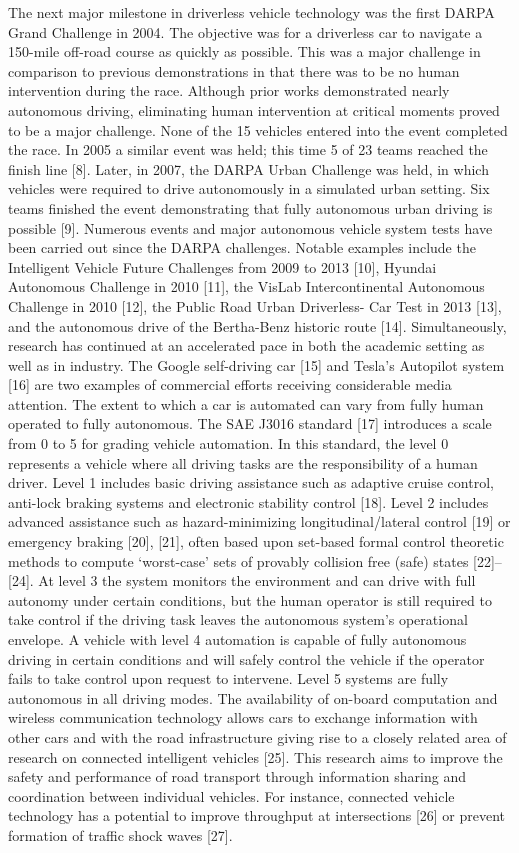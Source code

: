 The next major milestone in driverless vehicle technology was the first DARPA Grand Challenge in 2004. The objective was for a driverless car to navigate a 150-mile off-road course as quickly as possible. This was a major challenge in comparison to previous demonstrations in that there was to be no human intervention during the race. Although prior works demonstrated nearly autonomous driving, eliminating human intervention at critical moments proved to be a major challenge. None of the 15 vehicles entered into the event completed the race. In 2005 a similar event was held; this time 5 of 23 teams reached the finish line [8]. Later, in 2007, the DARPA Urban Challenge was held, in which vehicles were required to drive autonomously in a simulated urban setting. Six teams finished the event demonstrating that fully autonomous urban driving is possible [9]. Numerous events and major autonomous vehicle system tests have been carried out since the DARPA challenges. Notable examples include the Intelligent Vehicle Future Challenges from 2009 to 2013 [10], Hyundai Autonomous Challenge in 2010 [11], the VisLab Intercontinental Autonomous Challenge in 2010 [12], the Public Road Urban Driverless- Car Test in 2013 [13], and the autonomous drive of the Bertha-Benz historic route [14]. Simultaneously, research has continued at an accelerated pace in both the academic setting as well as in industry. The Google self-driving car [15] and Tesla’s Autopilot system [16] are two examples of commercial efforts receiving considerable media attention. The extent to which a car is automated can vary from fully human operated to fully autonomous. The SAE J3016 standard [17] introduces a scale from 0 to 5 for grading vehicle automation. In this standard, the level 0 represents a vehicle where all driving tasks are the responsibility of a human driver. Level 1 includes basic driving assistance such as adaptive cruise control, anti-lock braking systems and electronic stability control [18]. Level 2 includes advanced assistance such as hazard-minimizing longitudinal/lateral control [19] or emergency braking [20], [21], often based upon set-based formal control theoretic methods to compute ‘worst-case’ sets of provably collision free (safe) states [22]–[24]. At level 3 the system monitors the environment and can drive with full autonomy under certain conditions, but the human operator is still required to take control if the driving task leaves the autonomous system’s operational envelope. A vehicle with level 4 automation is capable of fully autonomous driving in certain conditions and will safely control the vehicle if the operator fails to take control upon request to intervene. Level 5 systems are fully autonomous in all driving modes. The availability of on-board computation and wireless communication technology allows cars to exchange information with other cars and with the road infrastructure giving rise to a closely related area of research on connected intelligent vehicles [25]. This research aims to improve the safety and performance of road transport through information sharing and coordination between individual vehicles. For instance, connected vehicle technology has a potential to improve throughput at intersections [26] or prevent formation of traffic shock waves [27].

